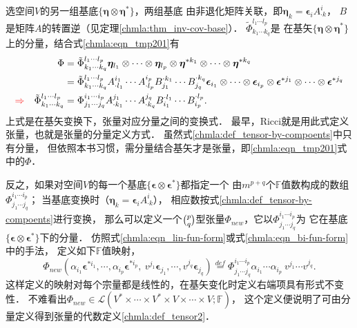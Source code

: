选空间$V$的另一组基底$\{\boldsymbol{\eta}\otimes\boldsymbol{\eta}^{*}\}$，两组基底
由非退化矩阵关联，即$\boldsymbol{\eta}_k = \boldsymbol{\epsilon}_i A_{\cdot k} ^i$，
$B$是矩阵$A$的转置逆（见定理\ref{chmla:thm_inv-cov-base}）．
$\tilde{\Phi}^{l_1 \cdots l_p} _{k_1 \cdots k_q}$是
在基矢$\{\boldsymbol{\eta}\otimes\boldsymbol{\eta}^{*}\}$上的分量，结合式\eqref{chmla:eqn_tmp201}有
\begin{align}
    \Phi &= \tilde{\Phi}_{k_1 \cdots k_q} ^{l_1 \cdots l_p}
    \boldsymbol{\eta}_{l_1} \otimes\cdots\otimes \boldsymbol{\eta}_{l_p} \otimes
    \boldsymbol{\eta}^{*k_1} \otimes\cdots\otimes \boldsymbol{\eta}^{*k_q} \notag \\
    &= \tilde{\Phi}_{k_1 \cdots k_q} ^{l_1 \cdots l_p}
    A_{\cdot l_1} ^{i_1}\cdots A_{\cdot l_p} ^{i_p}
    B_{j_1}^{\cdot k_1} \cdots B_{j_q}^{\cdot k_q}
    \boldsymbol{\epsilon}_{i_1} \otimes\cdots\otimes \boldsymbol{\epsilon}_{i_p} \otimes
    \boldsymbol{\epsilon}^{*j_1} \otimes\cdots\otimes \boldsymbol{\epsilon}^{*j_q} \notag \\
    {\color{red}\Rightarrow}\quad
    \tilde{\Phi}^{l_1 \cdots l_p} _{k_1 \cdots k_q} &= \Phi^{i_1 \cdots i_p} _{j_1 \cdots j_q}
      A_{\cdot k_1}^{j_1} \cdots A_{\cdot k_q}^{j_q}  B_{i_1}^{\cdot l_1} \cdots B_{i_p}^{\cdot l_p} .
    \label{chmla:def_tensor-by-compoents}
\end{align}
上式是在基矢变换下，张量对应分量之间的变换式．  
最早，Ricci就是用此式定义张量，也就是张量的分量定义方式．
虽然式\eqref{chmla:def_tensor-by-compoents}中只有分量，
但依照本书习惯，需分量结合基矢才是张量，即\eqref{chmla:eqn_tmp201}式中的$\Phi$．

反之，如果对空间$V$的每一个基底$\{\boldsymbol{\epsilon}\otimes\boldsymbol{\epsilon}^{*}\}$都指定一个
由$m^{p+q}$个$\mathbb{F}$值数构成的数组$\Phi^{i_1 \cdots i_p} _{j_1 \cdots j_q}$；
当基底变换时（$\boldsymbol{\eta}_k = \boldsymbol{\epsilon}_i A_{\cdot k} ^i$），
相应数按式\eqref{chmla:def_tensor-by-compoents}进行变换，
那么可以定义一个$\binom{p}{q}$型张量$\Phi_{new}$，它以$\Phi^{i_1 \cdots i_p} _{j_1 \cdots j_q}$为
它在基底$\{\boldsymbol{\epsilon}\otimes\boldsymbol{\epsilon}^{*}\}$下的分量．
仿照式\eqref{chmla:eqn_lin-fun-form}或式\eqref{chmla:eqn_bi-fun-form}中的手法，
定义如下$\mathbb{F}$值映射，
\begin{equation*}
    \Phi_{new}\left(\alpha_{i_1}\boldsymbol{\epsilon}^{*i_1},\cdots,
      \alpha_{i_p}\boldsymbol{\epsilon}^{*i_p},\
      v^{j_1}\boldsymbol{\epsilon}_{j_1},\cdots,
      v^{j_q}\boldsymbol{\epsilon}_{j_q} \right)
      \overset{def}{=} \Phi^{i_1 \cdots i_p} _{j_1 \cdots j_q}
      \alpha_{i_1}\cdots\alpha_{i_p}\ v^{j_1}\cdots v^{j_q} .
\end{equation*}
这样定义的映射对每个宗量都是线性的，在基矢变化时定义右端项具有形式不变性．
不难看出$\Phi_{new}\in \mathscr{L}(V^* \times \cdots \times V^*
\times V\times \cdots \times V;\mathbb{F})$，
这个定义便说明了可由分量定义得到张量的代数定义\ref{chmla:def_tensor2}．


